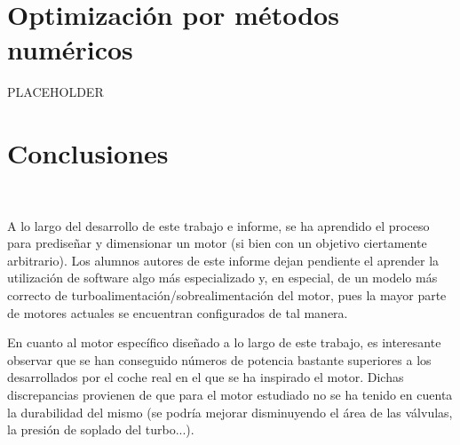 \section{Optimización por métodos numéricos} \label{s:section_08}

PLACEHOLDER

\section{Conclusiones} \label{s:section_09}

A lo largo del desarrollo de este trabajo e informe, se ha aprendido el proceso para prediseñar y dimensionar un motor (si bien con un objetivo ciertamente arbitrario). Los alumnos autores de este informe dejan pendiente el aprender la utilización de software algo más especializado y, en especial, de un modelo más correcto de turboalimentación/sobrealimentación del motor, pues la mayor parte de motores actuales se encuentran configurados de tal manera.

En cuanto al motor específico diseñado a lo largo de este trabajo, es interesante observar que se han conseguido números de potencia bastante superiores a los desarrollados por el coche real en el que se ha inspirado el motor. Dichas discrepancias provienen de que para el motor estudiado no se ha tenido en cuenta la durabilidad del mismo (se podría mejorar disminuyendo el área de las válvulas, la presión de soplado del turbo...).







